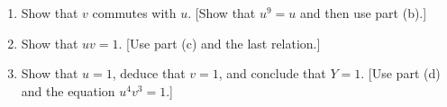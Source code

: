 \begin{enumerate}
{\begin{enumerate}
                           $(v^2u^2)(uv)$ and using the relations to reduce this
                           to the right hand side. Then use part (a).]
                     \item Show that $v$ commutes with $u$. [Show that $u^9 = u$
                           and then use part (b).]
                     \item Show that $uv = 1$. [Use part (c) and the last
                           relation.]
                     \item Show that $u = 1$, deduce that $v = 1$, and conclude
                           that $Y = 1$. [Use part (d) and the equation
                           $u^4v^3 = 1$.]
                  \end{enumerate}}
\end{enumerate}
